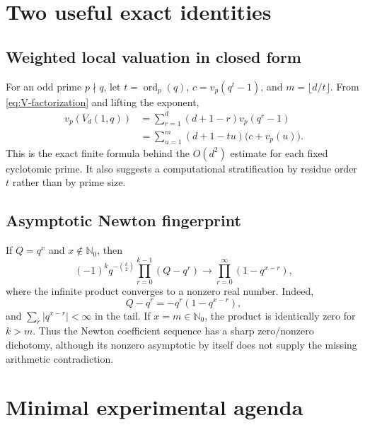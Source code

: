 \documentclass[11pt]{article}
\theoremstyle{definition}
\theoremstyle{remark}
\newcommand{\N}{\mathbb N}
\newcommand{\ord}{\operatorname{ord}}
\begin{document}
\appendix

\section{Two useful exact identities}

\subsection{Weighted local valuation in closed form}

For an odd prime $p\nmid q$, let $t=\ord_p(q)$,
$c=v_p(q^t-1)$, and $m=\lfloor d/t\rfloor$.  From
\eqref{eq:V-factorization} and lifting the exponent,
\begin{align}
 v_p(V_d(1,q))
 &=\sum_{r=1}^{d}(d+1-r)v_p(q^r-1)\\
 &=\sum_{u=1}^{m}(d+1-tu)\bigl(c+v_p(u)\bigr).
 \label{eq:appendix-weighted-vp}
\end{align}
This is the exact finite formula behind the $O(d^2)$ estimate for each fixed
cyclotomic prime.  It also suggests a computational stratification by residue
order $t$ rather than by prime size.

\subsection{Asymptotic Newton fingerprint}

If $Q=q^x$ and $x\notin\N_0$, then
\begin{equation}\label{eq:qpoch-limit}
 (-1)^k q^{-\binom{k}{2}}
 \prod_{r=0}^{k-1}(Q-q^r)
 \longrightarrow
 \prod_{r=0}^{\infty}(1-q^{x-r}),
\end{equation}
where the infinite product converges to a nonzero real number.  Indeed,
\[
 Q-q^r=-q^r(1-q^{x-r}),
\]
and $\sum_r|q^{x-r}|<\infty$ in the tail.  If $x=m\in\N_0$, the product is
identically zero for $k>m$.  Thus the Newton coefficient sequence has a sharp
zero/nonzero dichotomy, although its nonzero asymptotic by itself does not
supply the missing arithmetic contradiction.

\section{Minimal experimental agenda}
\end{document}
